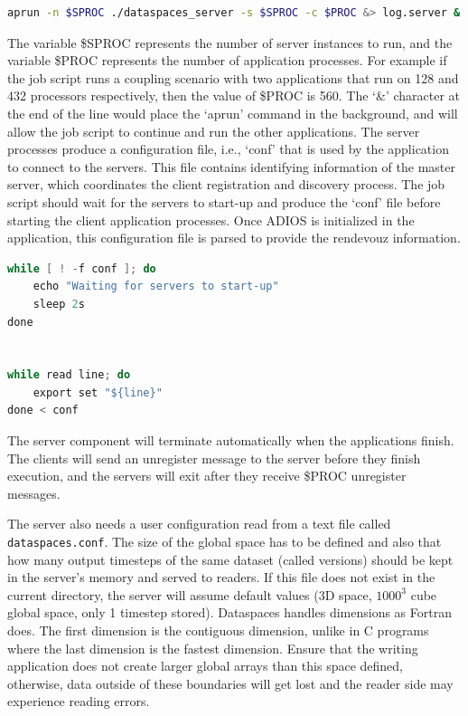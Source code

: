 \begin{lstlisting}[language=bash, caption=Start the server component in a job file first.]
aprun -n $SPROC ./dataspaces_server -s $SPROC -c $PROC &> log.server &
\end{lstlisting}

The variable \$SPROC represents the number of server instances to run, and the 
variable \$PROC represents the number of application processes. For example if 
the job script runs a coupling scenario with two applications that run on 128 and 
432 processors respectively, then the value of \$PROC is 560. The `\&' character 
at the end of the line would place the `aprun' command in the background, and will 
allow the job script to continue and run the other applications. The server processes 
produce a configuration file, i.e., `conf' that is used by the application  
to connect to the servers. This file contains identifying information of the 
master server, which coordinates the client registration 
and discovery process. The job script should wait for the servers to start-up and 
produce the `conf' file before starting the client application processes. 
Once ADIOS is initialized in the application, this configuration file is parsed
to provide the rendevouz information. 

\begin{lstlisting}[language=C, caption=Wait for server start-up completion and export the configuration to environment variables.]
while [ ! -f conf ]; do
	echo "Waiting for servers to start-up"
	sleep 2s
done


while read line; do
	export set "${line}"
done < conf
\end{lstlisting}

The server component will terminate automatically when the applications finish. 
The clients  will send an unregister message to the server before 
they finish execution, and the servers will exit after they receive \$PROC unregister 
messages.

The server also needs a user configuration read from a text file called \verb+dataspaces.conf+. The size of the global space has to be defined and also that how many output timesteps of the same dataset (called versions) should be kept in the server's memory and served to readers. If this file does not exist in the current directory, the server will assume default values (3D space, $1000^3$ cube global space, only 1 timestep stored). Dataspaces handles dimensions as Fortran does. The first dimension is the contiguous dimension, unlike in C programs where the last dimension is the fastest dimension. Ensure that the writing application does not create larger global arrays than this space defined, otherwise, data outside of these boundaries will get lost and the reader side may experience reading errors.

